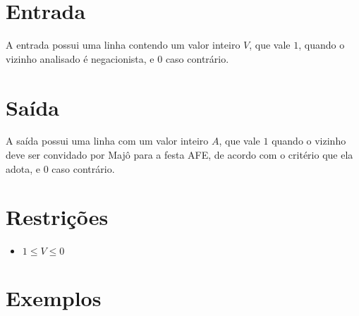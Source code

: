 \section*{Entrada}

A entrada possui uma linha contendo um valor inteiro $V$, que vale $1$, quando o vizinho analisado é negacionista, e $0$ caso contrário.

\section*{Saída}

A saída possui uma linha com um valor inteiro $A$, que vale $1$ quando o vizinho deve ser convidado por Majô para a festa AFE, de acordo com o critério que ela adota, e $0$ caso contrário.

\section*{Restrições}

\begin{itemize}
	\item $1 \leq V \leq 0$
\end{itemize}


\section*{Exemplos}

\exemplo
